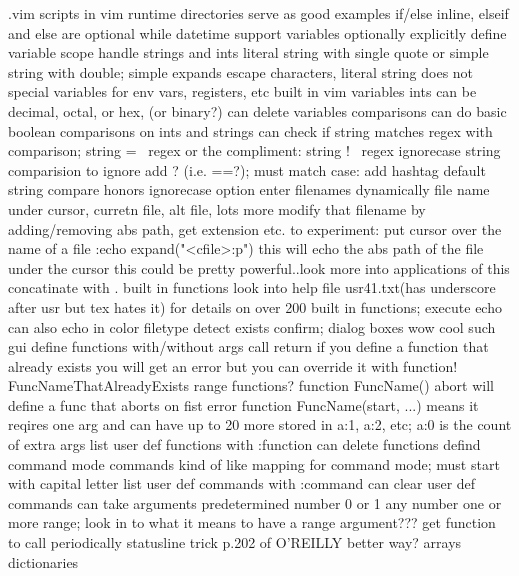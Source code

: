 \documentclass[12pt]{book}
\begin{document}
{{    .vim scripts in vim runtime directories serve as good examples
    if/else
      inline, elseif and else are optional
    while
    datetime support
    variables
      optionally explicitly define variable scope
      handle strings and ints
      literal string with single quote or simple string with double; simple expands escape characters, literal string does not
      special variables for env vars, registers, etc
      built in vim variables
      ints can be decimal, octal, or hex, (or binary?)
      can delete variables
    comparisons
      can do basic boolean comparisons on ints and strings
      can check if string matches regex with comparison; string =~ regex or the compliment: string !~ regex
      ignorecase string comparision
        to ignore add ? (i.e. ==?); must match case: add hashtag
        default string compare honors ignorecase option
    enter filenames dynamically
      file name under cursor, curretn file, alt file, lots more
      modify that filename by adding/removing abs path, get extension etc.
      to experiment:
        put cursor over the name of a file
        :echo expand("<cfile>:p")
        this will echo the abs path of the file under the cursor
        this could be pretty powerful..look more into applications of this
    concatinate with .
    built in functions
      look into help file usr41.txt(has underscore after usr but tex hates it) for details on over 200 built in functions;
      execute
      echo
        can also echo in color
      filetype detect
      exists
      confirm; dialog boxes wow cool such gui
    define functions
      with/without args
      call
      return
      if you define a function that already exists you will get an error but you can override it with function! FuncNameThatAlreadyExists
      range functions?
      function FuncName() abort will define a func that aborts on fist error
      function FuncName(start, ...) means it reqires one arg and can have up to 20 more stored in a:1, a:2, etc; a:0 is the count of extra args
      list user def functions with :function
      can delete functions
    defind command mode commands
      kind of like mapping for command mode; must start with capital letter
      list user def commands with :command
      can clear user def commands
      can take arguments
        predetermined number
        0 or 1
        any number
        one or more
        range; look in to what it means to have a range argument???
    get function to call periodically
      statusline trick p.202 of O'REILLY
      better way?
    arrays
    dictionaries
}}
\end{document}
